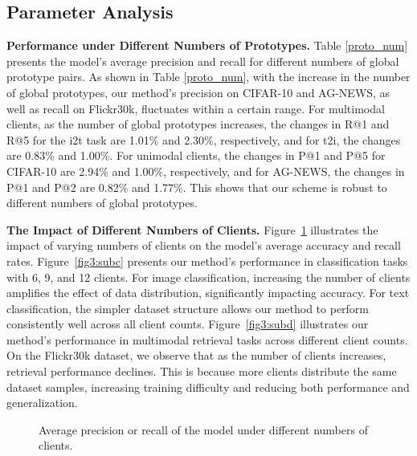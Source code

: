 \subsection{Parameter Analysis}
\noindent\textbf{Performance under Different Numbers of Prototypes.}
Table \ref{proto_num} presents the model's average precision and recall for different numbers of global prototype pairs. 
As shown in Table \ref{proto_num}, with the increase in the number of global prototypes, our method's precision on CIFAR-10 and AG-NEWS, as well as recall on Flickr30k, fluctuates within a certain range.
For multimodal clients, as the number of global prototypes increases, the changes in R@1 and R@5 for the i2t task are 1.01\% and 2.30\%, respectively, and for t2i, the changes are 0.83\% and 1.00\%. For unimodal clients, 
the changes in P@1 and P@5 for CIFAR-10 are 2.94\% and 1.00\%, respectively, and for AG-NEWS, the changes in P@1 and P@2 are 0.82\% and 1.77\%.
This shows that our scheme is robust to different numbers of global prototypes. 


\noindent\textbf{The Impact of Different Numbers of Clients.}
Figure~\ref{fig-clients} illustrates the impact of varying numbers of clients on the model's average accuracy and recall rates.
Figure~\ref{fig3:subc} presents our method’s performance in classification tasks with 6, 9, and 12 clients. For image classification, increasing the number of clients amplifies the effect of data distribution, significantly impacting accuracy. For text classification, the simpler dataset structure allows our method to perform consistently well across all client counts.
Figure~\ref{fig3:subd} illustrates our method’s performance in multimodal retrieval tasks across different client counts. On the Flickr30k dataset, we observe that as the number of clients increases, retrieval performance declines. This is because more clients distribute the same dataset samples, increasing training difficulty and reducing both performance and generalization.





\begin{figure}[t]
  \centering

  \hfil

  \caption{Average precision or recall of the model under different numbers of clients.}
  \label{fig-clients}
\end{figure}

